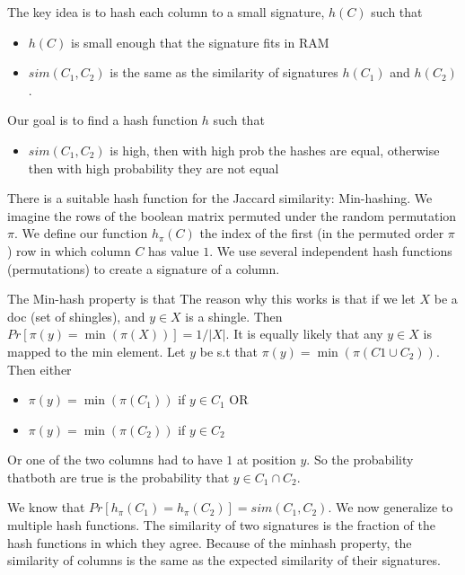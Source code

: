         The key idea is to hash each column to a small signature, $h(C)$ such that 
        \begin{itemize}
            \item $h(C)$ is small enough that the signature fits in RAM
            \item $sim(C_1, C_2)$ is the same as the similarity of signatures $h(C_1)$ and $h(C_2)$. 
        \end{itemize}
        Our goal is to find a hash function $h$ such that 
        \begin{itemize}
            \item $sim(C_1, C_2)$ is high, then with high prob the hashes are equal, otherwise then with high probability they are not equal
        \end{itemize}
        
        There is a suitable hash function for the Jaccard similarity: Min-hashing. We imagine the rows of the boolean matrix permuted under the random permutation $\pi$. We define our function $h_\pi(C)$ the index of the first (in the permuted order $\pi$) row in which column $C$ has value $1$.
        We use several independent hash functions (permutations) to create a signature of a column. 
        
        The Min-hash property is that 
        The reason why this works is that if we let $X$ be a doc (set of shingles), and $y \in X$ is a shingle. Then $Pr[\pi(y) = \min(\pi(X))] = 1/|X|$. It is equally likely that any $y \in X$ is mapped to the min element. Let $y$ be s.t that $\pi(y) = \min(\pi(C1 \cup C_2))$. Then either 
        \begin{itemize}
            \item $\pi(y) = \min(\pi(C_1))$ if $y \in C_1$ OR
            \item $\pi(y) = \min(\pi(C_2))$ if $y \in C_2$
        \end{itemize}
        Or one of the two columns had to have $1$ at position $y$. 
        So the probability thatboth are true is the probability that $y \in C_1 \cap C_2$. 
        
    We know that $Pr[h_\pi(C_1) = h_\pi(C_2)] = sim(C_1, C_2)$. We now generalize to multiple hash functions. The similarity of two signatures is the fraction of the hash functions in which they agree. Because of the minhash property, the similarity of columns is the same as the expected similarity of their signatures. 
    
